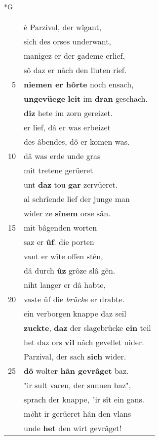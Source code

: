 \documentclass[8pt,a4paper,notitlepage]{article}
\begin{document}
\newpage
\begin{table}[ht]
\begin{minipage}[t]{0.5\linewidth}
\small
\begin{center}*G
\end{center}
\begin{tabular}{rl}
 & ê Parzival, der wîgant,\\ 
 & sich des orses underwant,\\ 
 & manigez er der gademe erlief,\\ 
 & sô daz er nâch den liuten rief.\\ 
5 & \textbf{niemen er hôrte} noch ensach,\\ 
 & \textbf{ungevüege} \textbf{leit} im \textbf{dran} geschach.\\ 
 & \textbf{diz} hete im zorn gereizet.\\ 
 & er lief, dâ er was erbeizet\\ 
 & des âbendes, dô er komen was.\\ 
10 & dâ was erde unde gras\\ 
 & mit tretene gerüeret\\ 
 & unt \textbf{daz} tou \textbf{gar} zervüeret.\\ 
 & al schrîende lief der junge man\\ 
 & wider ze \textbf{sînem} orse sân.\\ 
15 & mit bâgenden worten\\ 
 & saz er \textbf{ûf}. die porten\\ 
 & vant er wîte offen stên,\\ 
 & dâ durch \textbf{ûz} grôze slâ gên.\\ 
 & niht langer er dâ habte,\\ 
20 & vaste ûf die \textit{brück}e er drabte.\\ 
 & ein verborgen knappe daz seil\\ 
 & \textbf{zuckte}, \textbf{daz} der slagebrücke \textbf{ein} teil\\ 
 & het daz ors \textbf{vil} nâch gevellet nider.\\ 
 & Parzival, der sach \textbf{sich} wider.\\ 
25 & \textbf{dô} wolte\textbf{r} \textbf{hân gevrâget} baz.\\ 
 & "ir sult varen, der sunnen haz",\\ 
 & sprach der knappe, "ir sît ein gans.\\ 
 & m\textit{ö}ht ir gerüeret hân den vlans\\ 
 & unde \textbf{het} den wirt gevrâget!\\ 

\end{tabular}
\end{minipage}
\end{table}
\end{document}
